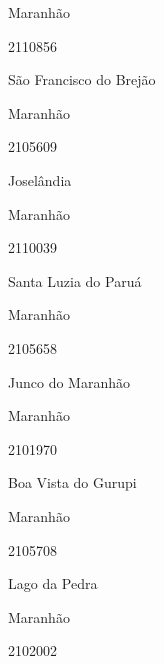 \documentclass[
  letterpaper,
]{report}
\begin{document}
Maranhão

\n      

2110856

\n      

São Francisco do Brejão

\n    

\n    

\n      

Maranhão

\n      

2105609

\n      

Joselândia

\n    

\n    

\n      

Maranhão

\n      

2110039

\n      

Santa Luzia do Paruá

\n    

\n    

\n      

Maranhão

\n      

2105658

\n      

Junco do Maranhão

\n    

\n    

\n      

Maranhão

\n      

2101970

\n      

Boa Vista do Gurupi

\n    

\n    

\n      

Maranhão

\n      

2105708

\n      

Lago da Pedra

\n    

\n    

\n      

Maranhão

\n      

2102002

\n      
\end{document}
